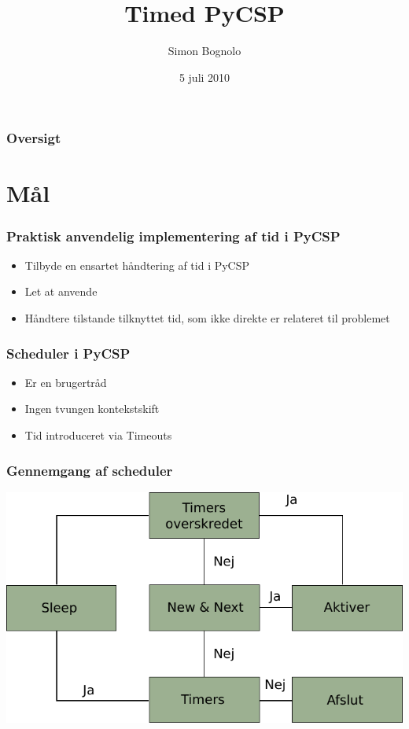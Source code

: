 \documentclass[12pt]{beamer}
\title
{Timed PyCSP}
\institute
{Datalogisk Institut \\ Københavns Universitet}
\author
{Simon Bognolo}
\date
{5 juli 2010}
\begin{document}
\frame[plain]\titlepage
 
\begin{frame}
  \frametitle{Oversigt}
  \tableofcontents
\end{frame}

\section{Mål}
\begin{frame}
  \frametitle{Praktisk anvendelig implementering af tid i PyCSP}
  \begin{itemize}
	\item Tilbyde en ensartet håndtering af tid i PyCSP
	\item Let at anvende
	\item Håndtere tilstande tilknyttet tid, som ikke direkte er relateret til problemet
  \end{itemize}
\end{frame}

\begin{frame} 
  \frametitle{Scheduler i PyCSP}
  \begin{itemize}
	\item Er en brugertråd
	\item Ingen tvungen kontekstskift
	\item Tid introduceret via Timeouts
  \end{itemize}
\end{frame}

\begin{frame}
  \frametitle{Gennemgang af scheduler}
  \includegraphics[scale=0.9]{pycsp-scheduler} 
\end{frame}
\end{document}
